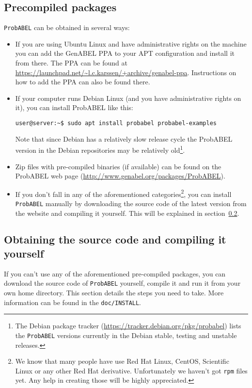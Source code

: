 \documentclass[12pt,a4paper]{article}
\newcommand{\PA}{\texttt{ProbABEL}}
\begin{document}
\subsection{Precompiled packages}
\PA{} can be obtained in several ways:
\begin{itemize}
\item If you are using Ubuntu Linux and have administrative rights on
  the machine you can add the GenABEL PPA to your APT configuration
  and install it from there. The PPA can be found at
  \url{https://launchpad.net/~l.c.karssen/+archive/genabel-ppa}. Instructions
  on how to add the PPA can also be found there.
\item If your computer runs Debian Linux (and you have
  administrative rights on it), you can install ProbABEL like this:
  \begin{lstlisting}[basicstyle=\footnotesize\ttfamily,]
user@server:~$ sudo apt install probabel probabel-examples
  \end{lstlisting}
  Note that since Debian has a relatively slow release cycle the
  ProbABEL version in the Debian repositories may be relatively
  old\footnote{The Debian package tracker
    (\url{https://tracker.debian.org/pkg/probabel}) lists the \PA{}
    versions currently in the Debian stable, testing and unstable
    releases.}.
\item Zip files with pre-compiled binaries (if available) can be found
  on the ProbABEL web page
  (\url{http://www.genabel.org/packages/ProbABEL}).
\item If you don't fall in any of the aforementioned
  categories\footnote{We know that many people have use Red Hat Linux,
    CentOS, Scientific Linux or any other Red Hat
    derivative. Unfortunately we haven't got \texttt{rpm} files
    yet. Any help in creating those will be highly appreciated.}, you
  can install \PA{} manually by downloading the source code of the
  latest version from the website and compiling it yourself. This will
  be explained in section~\ref{sec:obtain}.
\end{itemize}


\subsection{Obtaining the source code and compiling it yourself}
\label{sec:obtain}
If you can't use any of the aforementioned pre-compiled packages, you
can download the source code of \PA{} yourself, compile it and run it
from your own home directory. This section details the steps you need
to take. More information can be found in the \texttt{doc/INSTALL}.
\end{document}
